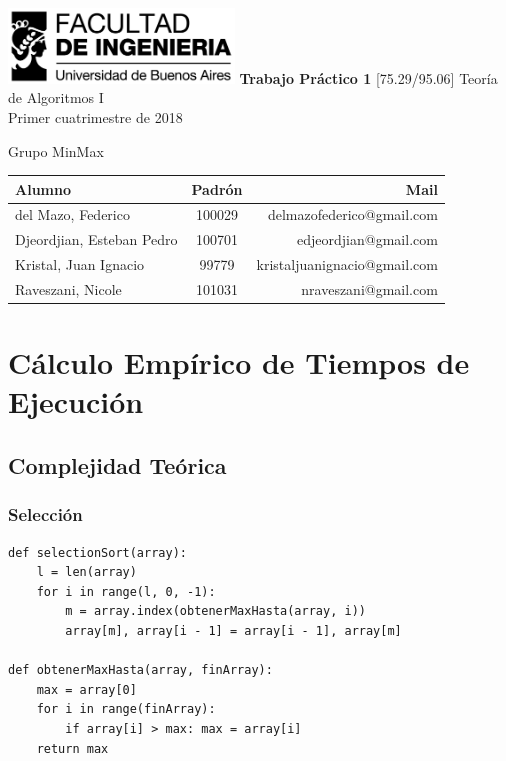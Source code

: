 \documentclass[titlepage,a4paper]{article}
\begin{document}
\begin{titlepage} %
	\hfill\includegraphics[width=6cm]{fiuba.jpg}
    \centering
    \vfill
    \Huge \textbf{Trabajo Práctico 1}
    \vskip2cm
    \Large [75.29/95.06] Teoría de Algoritmos I\\
    Primer cuatrimestre de 2018
    \vfill
    \begin{flushleft}
    Grupo MinMax
    \end{flushleft}
    \begin{tabular}{|l|c|r|}
	\hline
	Alumno & Padrón & Mail\\
	\hline
	\hline
	del Mazo, Federico & 100029 & delmazofederico@gmail.com\\
	\hline
    Djeordjian, Esteban Pedro & 100701 & edjeordjian@gmail.com\\	
	\hline
	Kristal, Juan Ignacio & 99779 & kristaljuanignacio@gmail.com\\
	\hline
    Raveszani, Nicole & 101031 & nraveszani@gmail.com\\
	\hline
	\end{tabular}
    \vfill
    \vfill
\end{titlepage}

\tableofcontents
\newpage
{}
\setcounter{page}{1}

\section{Cálculo Empírico de Tiempos de Ejecución}
\subsection{Complejidad Teórica}
\subsubsection{Selección}
\begin{verbatim}
def selectionSort(array):
	l = len(array)
	for i in range(l, 0, -1):
		m = array.index(obtenerMaxHasta(array, i))
		array[m], array[i - 1] = array[i - 1], array[m]
		
def obtenerMaxHasta(array, finArray):
    max = array[0]
    for i in range(finArray):
        if array[i] > max: max = array[i]
    return max
\end{verbatim}
\end{document}

